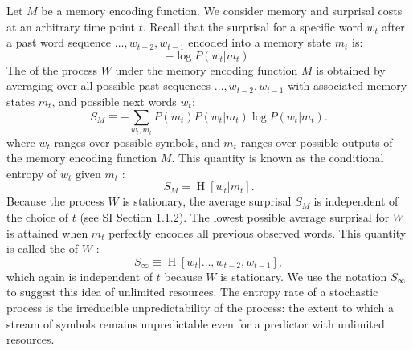 Let $M$ be a memory encoding function.
We consider memory and surprisal costs at an arbitrary time point $t$.
Recall that the surprisal for a specific word $w_t$ after a past word sequence $\dots, w_{t-2}, w_{t-1}$ encoded into a memory state $m_t$ is:
\begin{equation*}
    -\log P(w_t | m_t).
\end{equation*}
The  of the process $W$ under the memory encoding function $M$ is obtained by averaging over all possible past sequences $\dots, w_{t-2}, w_{t-1}$ with associated memory states $m_t$, and possible next words $w_t$:
\begin{equation*}
   S_M \equiv -\sum_{w_t,m_t}  P(m_t) P(w_t|m_t) \log P(w_t | m_t).
\end{equation*}
where $w_t$ ranges over possible symbols, and $m_t$ ranges over possible outputs of the memory encoding function $M$.
This quantity is known as the conditional entropy of $w_t$ given $m_t$ \citep[][p. 17]{cover2006elements}:
\begin{equation*}
	S_M = \operatorname{H}[w_t | m_t].
\end{equation*}
Because the process $W$ is stationary, the average surprisal $S_M$ is independent of the choice of $t$ (see SI Section 1.1.2).
The lowest possible average surprisal for $W$ is attained when $m_t$ perfectly encodes all previous observed words.
This quantity is called the  of $W$ \citep[][pp. 74--75]{cover2006elements}:
\begin{equation*}
	S_\infty \equiv \operatorname{H}[w_t | \dots, w_{t-2}, w_{t-1}],
\end{equation*}
which again is independent of $t$ because $W$ is stationary.
We use the notation $S_\infty$ to suggest this idea of unlimited resources.
 The entropy rate of a stochastic process is the irreducible unpredictability of the process: the extent to which a stream of symbols remains unpredictable even for a predictor with unlimited resources. 

